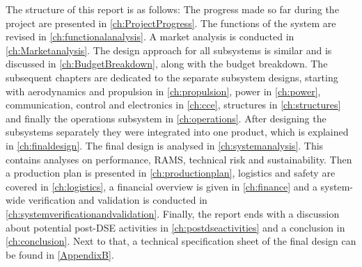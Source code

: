 The structure of this report is as follows: The progress made so far during the project are presented in \autoref{ch:ProjectProgress}. The functions of the system are revised in \autoref{ch:functionalanalysis}. A market analysis is conducted in \autoref{ch:Marketanalysis}. The design approach for all subsystems is similar and is discussed in \autoref{ch:BudgetBreakdown}, along with the budget breakdown. The subsequent chapters are dedicated to the separate subsystem designs, starting with aerodynamics and propulsion in \autoref{ch:propulsion}, power in \autoref{ch:power}, communication, control and electronics in \autoref{ch:cce}, structures in \autoref{ch:structures} and finally the operations subsystem in \autoref{ch:operations}. After designing the subsystems separately they were integrated into one product, which is explained in \autoref{ch:finaldesign}. The final design is analysed in \autoref{ch:systemanalysis}. This contains analyses on performance, RAMS, technical risk and sustainability. Then a production plan is presented in \autoref{ch:productionplan}, logistics and safety are covered in \autoref{ch:logistics}, a financial overview is given in \autoref{ch:finance} and a system-wide verification and validation is conducted in \autoref{ch:systemverificationandvalidation}. Finally, the report ends with a discussion about potential post-DSE activities in \autoref{ch:postdseactivities} and a conclusion in \autoref{ch:conclusion}. Next to that, a technical specification sheet of the final design can be found in \autoref{AppendixB}.